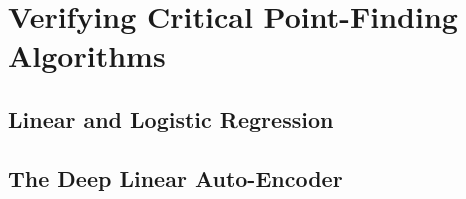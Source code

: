 \documentclass[../../thesis.tex]{subfiles}
\begin{document}
\section{Verifying Critical Point-Finding Algorithms}

\subsection{Linear and Logistic Regression}

\subsection{The Deep Linear Auto-Encoder}

\onlyinsubfile{\printbibliography}
\end{document}
